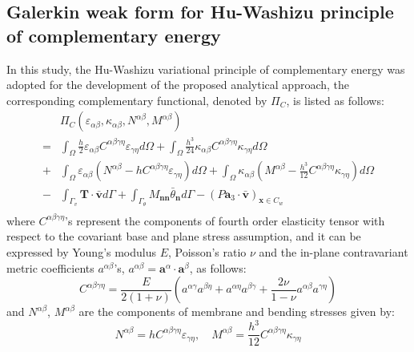 \subsection{Galerkin weak form for Hu-Washizu principle of complementary energy}
In this study, the Hu-Washizu variational principle of complementary energy \cite{dah-wei1985} was adopted for the development of the proposed analytical approach, the corresponding complementary functional, denoted by $\Pi_C$, is listed as follows:
\begin{equation} \label{functionalc}
\begin{split}
&\Pi_C(\varepsilon_{\alpha\beta},\kappa_{\alpha\beta},N^{\alpha\beta},M^{\alpha\beta}) \\
= &\int_\Omega \frac{h}{2}\varepsilon_{\alpha\beta} C^{\alpha\beta\gamma\eta}\varepsilon_{\gamma\eta}d\Omega 
+ \int_\Omega \frac{h^3}{24}\kappa_{\alpha\beta} C^{\alpha\beta\gamma\eta}\kappa_{\gamma\eta}d\Omega \\
+& \int_\Omega \varepsilon_{\alpha\beta} (N^{\alpha\beta} - h C^{\alpha\beta\gamma\eta} \varepsilon_{\gamma\eta}) d\Omega
+ \int_\Omega \kappa_{\alpha\beta} (M^{\alpha\beta} - \frac{h^3}{12} C^{\alpha\beta\gamma\eta} \kappa_{\gamma\eta}) d\Omega \\
-& \int_{\Gamma_v} \boldsymbol T \cdot \bar{\boldsymbol v} d\Gamma 
+ \int_{\Gamma_\theta} M_{\boldsymbol{nn}} \bar \theta_{\boldsymbol n} d\Gamma - (P \boldsymbol a_3 \cdot \bar{\boldsymbol v})_{\boldsymbol x \in C_w} \\
\end{split}
\end{equation}
where $C^{\alpha\beta\gamma\eta}$'s represent the components of fourth order elasticity tensor with respect to the covariant base and plane stress assumption, and it can be expressed by Young's modulus $E$, Poisson's ratio $\nu$ and the in-plane contravariant metric coefficients $a^{\alpha\beta}$'s, $a^{\alpha\beta} = \boldsymbol a^\alpha \cdot \boldsymbol a^\beta$, as follows: 
\begin{equation}
C^{\alpha\beta\gamma\eta} = \frac{E}{2(1+\nu)}(a^{\alpha\gamma}a^{\beta\eta} + a^{\alpha\eta}a^{\beta\gamma} + \frac{2\nu}{1-\nu} a^{\alpha\beta}a^{\gamma\eta})
\end{equation}
and $N^{\alpha\beta}$, $M^{\alpha\beta}$ are the components of membrane and bending stresses given by:
\begin{equation}
N^{\alpha\beta} = hC^{\alpha\beta\gamma\eta}\varepsilon_{\gamma\eta}, \quad
M^{\alpha\beta} = \frac{h^3}{12}C^{\alpha\beta\gamma\eta}\kappa_{\gamma\eta}
\end{equation}

